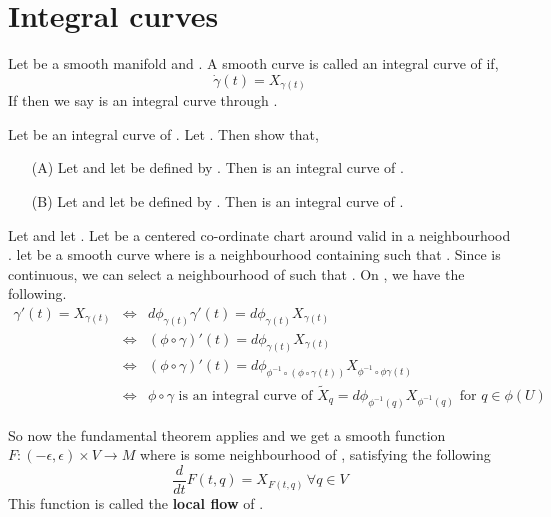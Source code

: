\documentclass{article}
\begin{document}
\section{Integral curves}

\begin{definition}
    Let  be a smooth manifold and . A smooth curve  is called an integral curve of  if,
    $$\dot{\gamma}(t) = X_{\gamma(t)}$$
    If  then we say \mm{\gamma} is an integral curve through .
\end{definition}

\begin{exercise*}
    Let  be an integral curve of . Let . Then show that,
    \begin{itemize}
        \item[(A)] Let  and let  be defined by . Then \mm{\eta} is an integral curve of .
        \item[(B)] Let  and let  be defined by . Then \mm{\zeta} is an integral curve of . 
    \end{itemize}
\end{exercise*}

Let  and let . Let  be a centered co-ordinate chart around  valid in a neighbourhood .
let  be a smooth curve where  is a neighbourhood containing  such that . Since \mm{\gamma} is continuous, we can select a neighbourhood  of  such that . 
On , we have the following.
\begin{eqnarray*}
    \gamma'(t) = X_{\gamma(t)} &\iff& d\phi_{\gamma(t)} \gamma'(t) = d\phi_{\gamma(t)}X_{\gamma(t)}\\
    &\iff& (\phi\circ \gamma)'(t) = d\phi_{\gamma(t)}X_{\gamma(t)}\\
    &\iff& (\phi\circ \gamma)'(t) = d\phi_{\phi^{-1}\circ(\phi\circ\gamma(t))}X_{\phi^{-1}\circ\phi\gamma(t)}\\
    &\iff& \phi\circ \gamma\text{ is an integral curve of }\tilde{X}_q=d\phi_{\phi^{-1}(q)}X_{\phi^{-1}(q)}\text{ for }q\in \phi(U)
\end{eqnarray*}

So now the fundamental theorem applies and we get a smooth function $F:(-\epsilon,\epsilon)\times V\to M $ where  is some neighbourhood of , satisfying the following
$$\frac{d}{dt}F(t,q) = X_{F(t,q)}\,\forall q\in V$$
This function is called the \textbf{local flow} of .
\end{document}
